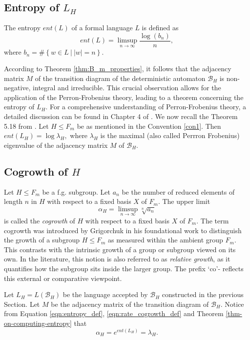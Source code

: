 \documentclass{article}
\newcommand{\B}{\mathcal{B}}
\begin{document}
\subsection{Entropy of $L_H$}\label{section-on-entropy} 
The entropy $ent(L)$ of a formal language $L$ is defined as 
\begin{equation}
     ent(L) =  \limsup_{n \rightarrow \infty} {\frac{\log(b_n)}{n}}, \label{eqn:entropy_def}
\end{equation}where $b_n = \#\left\{w \in L ~|~ |w| = n\right\}.$ 


According to Theorem \ref{thm:B_m_properties}, it follows that the adjacency matrix $M$ of the transition diagram of the deterministic automaton $\B_H$ is non-negative, integral and irreducible. This crucial observation allows for the application of the Perron-Frobenius theory, leading to a theorem concerning the entropy of $L_H$. For a comprehensive understanding of Perron-Frobenius theory, a detailed discussion can be found in Chapter 4 of \cite{Lind-Marcus}. We now recall the Theorem 5.18 from \cite{DGS2021}. 
{\mythm \label{thm-on-computing-entropy}
Let $H \leq F_m$ be as mentioned in the Convention \ref{con1}. Then $ent(L_H) = \log \lambda_H,$ where $\lambda_H$ is the maximal (also called Perrron Frobenius) eigenvalue of the adjacency matrix $M$ of $\B_H$.}

\subsection{Cogrowth of $H$}
Let $H \leq F_m$ be a f.g. subgroup. Let $a_n$ be the number of reduced elements of length $n$ in $H$ with respect to a fixed basis $X$ of $F_m$. The upper limit
\begin{equation}
    \alpha_H = \displaystyle \limsup_{n \rightarrow \infty} \sqrt[n]{a_n} \label{eqn:rate_cogrowth_def}
\end{equation} is called the \emph{cogrowth} of $H$ with respect to a fixed basis $X$ of $F_m$. The term cogrowth was introduced by Grigorchuk in his foundational work \cite{MR599539Gri1980} to distinguish the growth of a subgroup $H \leq F_m$ as measured within the ambient group $F_m$. This contrasts with the intrinsic growth of a group or subgroup viewed on its own. In the literature, this notion is also referred to as \emph{relative growth}, as it quantifies how the subgroup sits inside the larger group. The prefix `co'- reflects this external or comparative viewpoint.
 
Let $L_H = L(\B_H)$ be the language accepted by $\B_H$ constructed in the previous Section. Let $M$ be the adjacency matrix of the transition diagram of $\B_H$. 
Notice from Equation \eqref{eqn:entropy_def}, \eqref{eqn:rate_cogrowth_def} and Theorem \ref{thm-on-computing-entropy} that 
\begin{equation}
  \alpha_H = e^{ent(L_H)} = \lambda_H. \label{eqn:cogrowth_entropy}  
\end{equation}
\end{document}
